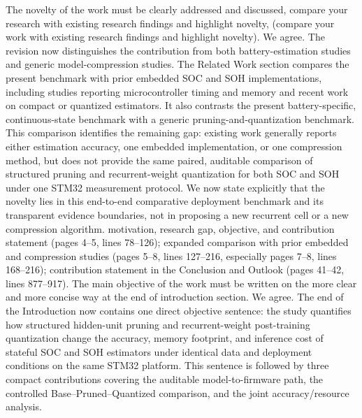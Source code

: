 {}\markdownRendererBlockQuoteBegin
The novelty of the work must be clearly addressed and discussed, compare your research with existing research findings and highlight novelty, (compare your work with existing research findings and highlight novelty).\markdownRendererBlockQuoteEnd \markdownRendererInterblockSeparator
{} We agree. The revision now distinguishes the contribution from both battery-estimation studies and generic model-compression studies. The Related Work section compares the present benchmark with prior embedded SOC and SOH implementations, including studies reporting microcontroller timing and memory and recent work on compact or quantized estimators. It also contrasts the present battery-specific, continuous-state benchmark with a generic pruning-and-quantization benchmark. This comparison identifies the remaining gap: existing work generally reports either estimation accuracy, one embedded implementation, or one compression method, but does not provide the same paired, auditable comparison of structured pruning and recurrent-weight quantization for both SOC and SOH under one STM32 measurement protocol. We now state explicitly that the novelty lies in this end-to-end comparative deployment benchmark and its transparent evidence boundaries, not in proposing a new recurrent cell or a new compression algorithm.\markdownRendererParagraphSeparator
{} motivation, research gap, objective, and contribution statement (pages 4--5, lines 78--126); expanded comparison with prior embedded and compression studies (pages 5--8, lines 127--216, especially pages 7--8, lines 168--216); contribution statement in the Conclusion and Outlook (pages 41--42, lines 877--917).\markdownRendererInterblockSeparator
{}
\markdownRendererSectionEnd \markdownRendererSectionBegin
{}\markdownRendererInterblockSeparator
{}\markdownRendererBlockQuoteBegin
The main objective of the work must be written on the more clear and more concise way at the end of introduction section.\markdownRendererBlockQuoteEnd \markdownRendererInterblockSeparator
{} We agree. The end of the Introduction now contains one direct objective sentence: the study quantifies how structured hidden-unit pruning and recurrent-weight post-training quantization change the accuracy, memory footprint, and inference cost of stateful SOC and SOH estimators under identical data and deployment conditions on the same STM32 platform. This sentence is followed by three compact contributions covering the auditable model-to-firmware path, the controlled Base--Pruned--Quantized comparison, and the joint accuracy/resource analysis.\markdownRendererParagraphSeparator
